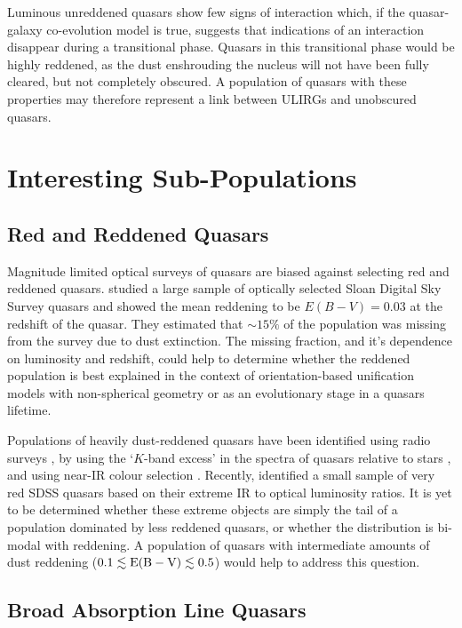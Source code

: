 Luminous unreddened quasars show few signs of interaction \citep[e.g.][]{dunlop03} which, if the quasar-galaxy co-evolution model is true, suggests that indications of an interaction disappear during a transitional phase. Quasars in this transitional phase would be highly reddened, as the dust enshrouding the nucleus will not have been fully cleared, but not completely obscured. A population of quasars with these properties may therefore represent a link between ULIRGs and unobscured quasars. 

\section{Interesting Sub-Populations}

\subsection{Red and Reddened Quasars}

Magnitude limited optical surveys of quasars are biased against selecting red and reddened quasars. \citet{richards03} studied a large sample of optically selected Sloan Digital Sky Survey \citep[SDSS;][]{york00} quasars and showed the mean reddening to be $E(B-V) = 0.03$ at the redshift of the quasar. They estimated that $\sim 15\%$ of the population was missing from the survey due to dust extinction.  The missing fraction, and it's dependence on luminosity and redshift, could help to determine whether the reddened population is best explained in the context of orientation-based unification models with non-spherical geometry or as an evolutionary stage in a quasars lifetime.   

Populations of heavily dust-reddened quasars have been identified using radio surveys \citep[e.g.][]{glikman12}, by using the `$K$-band excess' in the spectra of quasars relative to stars \citep{maddox12}, and using near-IR colour selection \citep{banerji12,banerji13}. Recently, \citet{ross14} identified a small sample of very red SDSS quasars based on their extreme IR to optical luminosity ratios. It is yet to be determined whether these extreme objects are simply the tail of a population dominated by less reddened quasars, or whether the distribution is bi-modal with reddening. A population of quasars with intermediate amounts of dust reddening ($0.1 \lesssim {\rm E(B-V)} \lesssim 0.5$) would help to address this question. 

\subsection{Broad Absorption Line Quasars}

